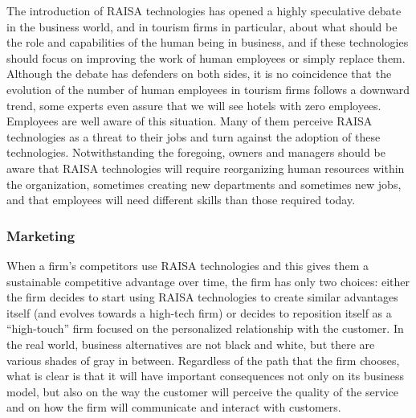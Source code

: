 \documentclass[
  letterpaper,
  DIV=11,
  numbers=noendperiod]{scrreprt}
\begin{document}
The introduction of RAISA technologies has opened a highly speculative
debate in the business world, and in tourism firms in particular, about
what should be the role and capabilities of the human being in business,
and if these technologies should focus on improving the work of human
employees or simply replace them. Although the debate has defenders on
both sides, it is no coincidence that the evolution of the number of
human employees in tourism firms follows a downward trend, some experts
even assure that we will see hotels with zero employees. Employees are
well aware of this situation. Many of them perceive RAISA technologies
as a threat to their jobs and turn against the adoption of these
technologies. Notwithstanding the foregoing, owners and managers should
be aware that RAISA technologies will require reorganizing human
resources within the organization, sometimes creating new departments
and sometimes new jobs, and that employees will need different skills
than those required today.

\hypertarget{marketing}{%
\subsubsection{Marketing}\label{marketing}}

When a firm's competitors use RAISA technologies and this gives them a
sustainable competitive advantage over time, the firm has only two
choices: either the firm decides to start using RAISA technologies to
create similar advantages itself (and evolves towards a high-tech firm)
or decides to reposition itself as a ``high-touch'' firm focused on the
personalized relationship with the customer. In the real world, business
alternatives are not black and white, but there are various shades of
gray in between. Regardless of the path that the firm chooses, what is
clear is that it will have important consequences not only on its
business model, but also on the way the customer will perceive the
quality of the service and on how the firm will communicate and interact
with customers.
\end{document}

